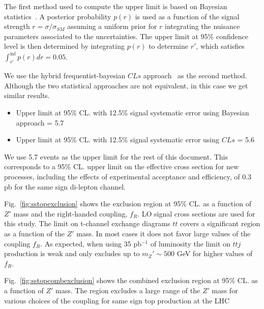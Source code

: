 The first method used to compute the upper limit is based on Bayesian statistics~\cite{bayesian}.
A posterior probability $p(r)$ is used as a function of the signal strength $r = \sigma/\sigma_{SM}$ 
assuming a uniform prior for $r$ integrating the nuisance parameters associated to the uncertainties.
The upper limit at 95\% confidence level is then determined by integrating $p(r)$ to determine $r'$, 
which satisfies $\int_{r'}^{\inf} p(r) dr = 0.05$.

We use the hybrid frequentist-bayesian $CLs$ approach~\cite{CLS} as the second method. 
Although the two statistical approaches are not equivalent, in this case we get similar results. 

\begin{itemize}
\item Upper limit at 95\% CL. with 12.5\% signal systematic error using Bayesian approach = 5.7  
\item Upper limit at 95\% CL. with 12.5\% signal systematic error using $CLs$ = 5.6  
\end{itemize}

We use 5.7 events as the upper limit for the rest of this document. 
This corresponds to a 95\% CL. upper limit on the effective cross section for new processes, 
including the effects of experimental acceptance and efficiency, of 0.3 pb for the same sign di-lepton channel.

Fig.~\ref{fig:sstopexclusion} shows the exclusion region at 95\% CL. as a function of $Z'$ mass and the right-handed coupling, $f_R$. 
LO signal cross sections are used for this study. 
The limit on t-channel exchange diagrams $tt$ covers a significant region as a function of the $Z'$ mass.
In most cases it does not favor large values of the coupling $f_R$. 
As expected, when using 35 pb$^{-1}$ of luminosity the limit on $ttj$ production is weak and 
only excludes up to $m_Z' \sim 500$ GeV for higher values of $f_R$. 

Fig.~\ref{fig:sstopcombexclusion} shows the combined exclusion region at 95\% CL. as a function of $Z'$ mass.
The region excludes a large range of the $Z'$ mass for various choices of the coupling for same sign top 
production at the LHC

